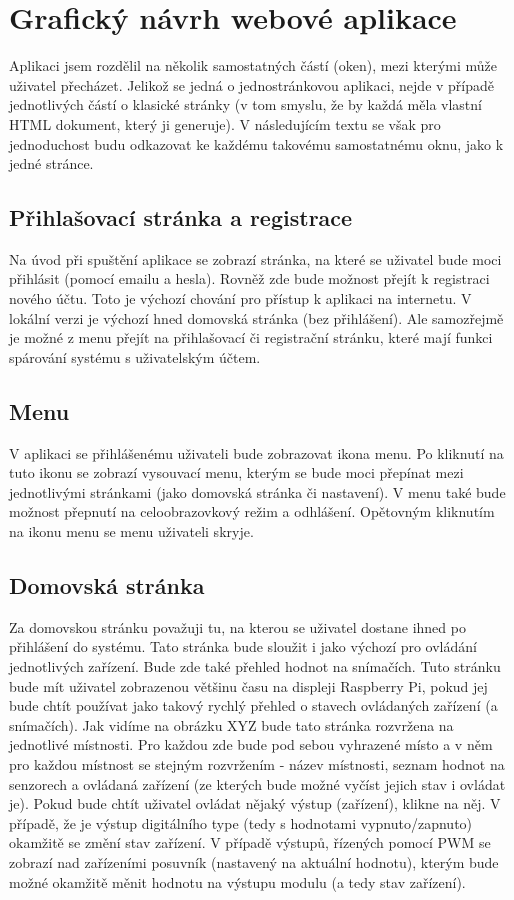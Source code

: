 \section{Grafický návrh webové aplikace}
Aplikaci jsem rozdělil na několik samostatných částí (oken), mezi kterými může uživatel přecházet. Jelikož se jedná o jednostránkovou aplikaci, nejde v případě jednotlivých částí o klasické stránky (v tom smyslu, že by každá měla vlastní HTML dokument, který ji generuje). V následujícím textu se však pro jednoduchost budu odkazovat ke každému takovému samostatnému oknu, jako k jedné stránce.

\subsection*{Přihlašovací stránka a registrace}
Na úvod při spuštění aplikace se zobrazí stránka, na které se uživatel bude moci přihlásit (pomocí emailu a hesla). Rovněž zde bude možnost přejít k registraci nového účtu. Toto je výchozí chování pro přístup k aplikaci na internetu. V lokální verzi je výchozí hned domovská stránka (bez přihlášení). Ale samozřejmě je možné z menu přejít na přihlašovací či registrační stránku, které mají funkci spárování systému s uživatelským účtem. 

\subsection*{Menu}
V aplikaci se přihlášenému uživateli bude zobrazovat ikona menu. Po kliknutí na tuto ikonu se zobrazí vysouvací menu, kterým se bude moci přepínat mezi jednotlivými stránkami (jako domovská stránka či nastavení). V menu také bude možnost přepnutí na celoobrazovkový režim a odhlášení. Opětovným kliknutím na ikonu menu se menu uživateli skryje.

\subsection*{Domovská stránka}
Za domovskou stránku považuji tu, na kterou se uživatel dostane ihned po přihlášení do systému. Tato stránka bude sloužit i jako výchozí pro ovládání jednotlivých zařízení. Bude zde také přehled hodnot na snímačích. Tuto stránku bude mít uživatel zobrazenou většinu času na displeji Raspberry Pi, pokud jej bude chtít používat jako takový rychlý přehled o stavech ovládaných zařízení (a snímačích).
Jak vidíme na obrázku XYZ bude tato stránka rozvržena na jednotlivé místnosti. Pro každou zde bude pod sebou vyhrazené místo a v něm pro každou místnost se stejným rozvržením - název místnosti, seznam hodnot na senzorech a ovládaná zařízení (ze kterých bude možné vyčíst jejich stav i ovládat je). Pokud bude chtít uživatel ovládat nějaký výstup (zařízení), klikne na něj. V případě, že je výstup digitálního type (tedy s hodnotami vypnuto/zapnuto) okamžitě se změní stav zařízení. V případě výstupů, řízených pomocí PWM se zobrazí nad zařízeními posuvník (nastavený na aktuální hodnotu), kterým bude možné okamžitě měnit hodnotu na výstupu modulu (a tedy stav zařízení).

